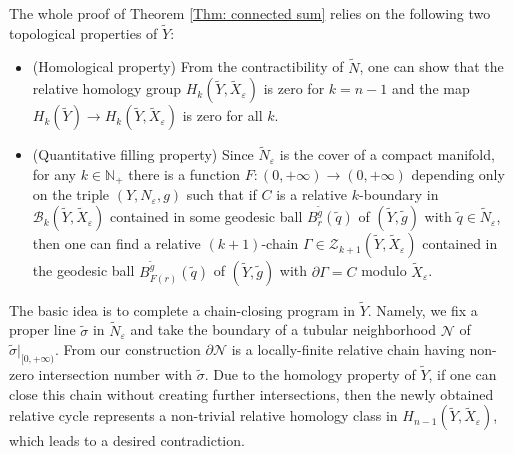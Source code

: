 \documentclass[11pt, reqno]{amsart}
\numberwithin{equation}{section}
\theoremstyle{definition}
\newcommand{\ve}{\varepsilon}
\newcommand{\ti}[1]{\tilde{#1}}
\begin{document}
The whole proof of Theorem \ref{Thm: connected sum} relies on the following two topological properties of $\tilde Y$:
\begin{itemize}\setlength{\itemsep}{1mm}
\item (Homological property) From the contractibility of $\tilde N$, one can show that the relative homology group $H_k(\tilde Y, \ti X_{\ve})$ is zero for $k = n-1$ and the map $H_k(\tilde Y) \to H_k(\tilde Y, \ti X_{\ve})$ is zero for all $k$.
\item (Quantitative filling property) Since $\ti N_\ve$ is the cover of a compact manifold, for any $k\in \mathbb N_+$ there is a function $F:(0,+\infty)\to (0,+\infty)$ depending only on the triple $(Y, N_\ve, g)$ such that if $C$ is a relative $k$-boundary in $\mathcal B_k(\ti Y, \ti X_{\ve})$ contained in some geodesic ball $B_{r}^{\ti{g}}(\tilde q)$ of $(\ti Y,\tilde g)$ with $\tilde q\in \tilde N_\ve$, then one can find a relative $(k+1)$-chain $\Gamma \in \mathcal Z_{k+1}(\ti Y,  \ti X_{\ve})$ contained in the geodesic ball $B_{F(r)}^{\ti{g}}(\tilde q)$ of $(\tilde Y,\tilde g)$ with $\partial\Gamma=C$ modulo $ \ti X_{\ve}$.
\end{itemize}

The basic idea is to complete a chain-closing program in $\tilde Y$. Namely, we fix a proper line $\tilde \sigma$ in $\tilde{N}_\ve$ and take the boundary of a tubular neighborhood $\mathcal N$ of $\tilde \sigma|_{[0,+\infty)}$. From our construction $\partial \mathcal N$ is a locally-finite relative chain having non-zero intersection number with $\tilde\sigma$. Due to the homology property of $\tilde Y$, if one can close this chain without creating further intersections, then the newly obtained relative cycle represents a non-trivial relative homology class in $H_{n-1}(\tilde Y, \ti X_{\ve})$, which leads to a desired contradiction.
\end{document}
